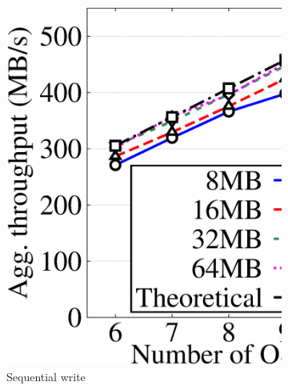 \begin{figure}[!t]
\centering
 \begin{subfigure}{0.48\linewidth}
     \includegraphics[width=\linewidth]{charts/transfer/eps/up/rdp_6}
     \caption{Sequential write}
     \label{fig:rdp_write}
 \end{subfigure}
 \hspace{0.005\linewidth}
 \begin{subfigure}{0.48\linewidth}

\end{subfigure}
\end{figure}
